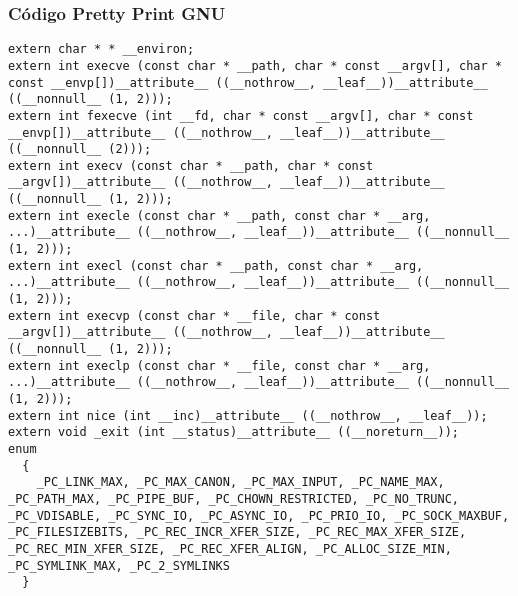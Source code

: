 \documentclass{beamer}
\begin{document}
\begin{frame}[fragile]
\frametitle{C\'odigo Pretty Print GNU}
\begin{verbatim}
extern char * * __environ;
extern int execve (const char * __path, char * const __argv[], char * const __envp[])__attribute__ ((__nothrow__, __leaf__))__attribute__ ((__nonnull__ (1, 2)));
extern int fexecve (int __fd, char * const __argv[], char * const __envp[])__attribute__ ((__nothrow__, __leaf__))__attribute__ ((__nonnull__ (2)));
extern int execv (const char * __path, char * const __argv[])__attribute__ ((__nothrow__, __leaf__))__attribute__ ((__nonnull__ (1, 2)));
extern int execle (const char * __path, const char * __arg, ...)__attribute__ ((__nothrow__, __leaf__))__attribute__ ((__nonnull__ (1, 2)));
extern int execl (const char * __path, const char * __arg, ...)__attribute__ ((__nothrow__, __leaf__))__attribute__ ((__nonnull__ (1, 2)));
extern int execvp (const char * __file, char * const __argv[])__attribute__ ((__nothrow__, __leaf__))__attribute__ ((__nonnull__ (1, 2)));
extern int execlp (const char * __file, const char * __arg, ...)__attribute__ ((__nothrow__, __leaf__))__attribute__ ((__nonnull__ (1, 2)));
extern int nice (int __inc)__attribute__ ((__nothrow__, __leaf__));
extern void _exit (int __status)__attribute__ ((__noreturn__));
enum
  {
    _PC_LINK_MAX, _PC_MAX_CANON, _PC_MAX_INPUT, _PC_NAME_MAX, _PC_PATH_MAX, _PC_PIPE_BUF, _PC_CHOWN_RESTRICTED, _PC_NO_TRUNC, _PC_VDISABLE, _PC_SYNC_IO, _PC_ASYNC_IO, _PC_PRIO_IO, _PC_SOCK_MAXBUF, _PC_FILESIZEBITS, _PC_REC_INCR_XFER_SIZE, _PC_REC_MAX_XFER_SIZE, _PC_REC_MIN_XFER_SIZE, _PC_REC_XFER_ALIGN, _PC_ALLOC_SIZE_MIN, _PC_SYMLINK_MAX, _PC_2_SYMLINKS
  }\end{verbatim}
\end{frame}
\end{document}
